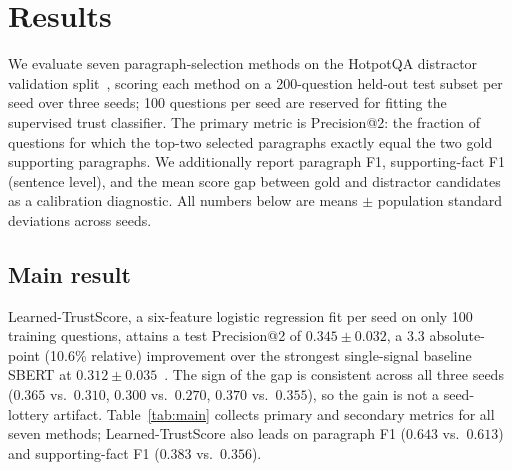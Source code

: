 \section{Results}
\label{sec:results}

We evaluate seven paragraph-selection methods on the HotpotQA distractor
validation split~\cite{yang2018hotpotqa}, scoring each method on a
200-question held-out test subset per seed over three seeds; 100 questions
per seed are reserved for fitting the supervised trust classifier. The
primary metric is Precision@2: the fraction of questions for which the
top-two selected paragraphs exactly equal the two gold supporting
paragraphs. We additionally report paragraph F1, supporting-fact F1
(sentence level), and the mean score gap between gold and distractor
candidates as a calibration diagnostic. All numbers below are means
$\pm$ population standard deviations across seeds.

\subsection*{Main result}

Learned-TrustScore, a six-feature logistic regression fit per seed on
only 100 training questions, attains a test Precision@2 of
$\mathbf{0.345 \pm 0.032}$, a 3.3 absolute-point (10.6\% relative)
improvement over the strongest single-signal baseline SBERT at
$0.312 \pm 0.035$~\cite{reimers2019sbert}. The sign of the gap is
consistent across all three seeds ($0.365$ vs.\ $0.310$, $0.300$ vs.\
$0.270$, $0.370$ vs.\ $0.355$), so the gain is not a seed-lottery
artifact. Table~\ref{tab:main} collects primary and secondary metrics
for all seven methods; Learned-TrustScore also leads on paragraph F1
($0.643$ vs.\ $0.613$) and supporting-fact F1 ($0.383$ vs.\ $0.356$).

